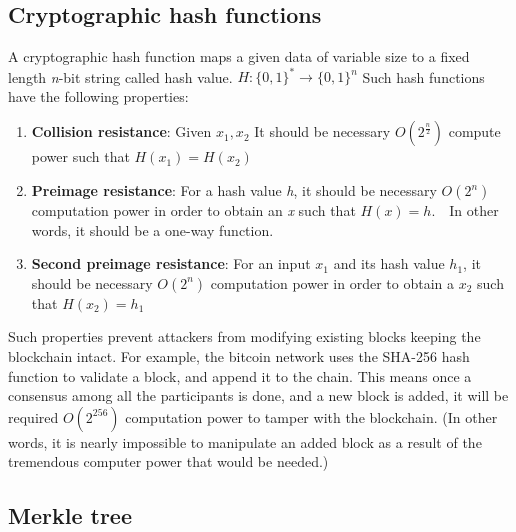 \documentclass[11pt,a4paper]{report}
\begin{document}
\subsection{Cryptographic hash functions}
A cryptographic hash function\cite{chf} maps a given data of variable size to a fixed length \emph{n}-bit string called hash value. $ H : \{0,1\}^* \to \{0,1\}^n $ Such hash functions have the following properties:
\begin{enumerate}
		
	\item \textbf{Collision resistance}: Given $x_1, x_2 $ It should be necessary $ O(2^\frac{n}{2}) $ compute power such that $H(x_1) = H(x_2)$
	
	\item \textbf{Preimage resistance}: For a hash value \emph{h}, it should be necessary $ O(2^n) $ computation power in order to obtain an \emph{x} such that $ H(x)=h $.~~In other words, it should be a one-way function.
	
	\item \textbf{Second preimage resistance}: For an input $x_1$ and its hash value $h_1$, it should be necessary $ O(2^n) $ computation power in order to obtain a $x_2$ such that $H(x_2)=h_1$

	
\end{enumerate}

Such properties prevent attackers from modifying existing blocks keeping the blockchain intact. For example, the bitcoin network uses the SHA-256 hash function to validate a block, and append it to the chain. This means once a consensus among all the participants is done, and a new block is added, it will be required $ O(2^{256}) $ computation power to tamper with the blockchain. (In other words, it is nearly impossible to manipulate an added block as a result of the tremendous computer power that would be needed.)

\subsection{Merkle tree}
\end{document}
